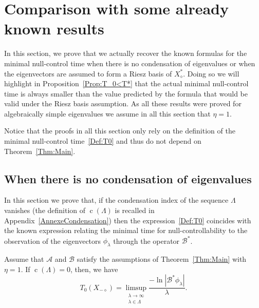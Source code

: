 \documentclass[10pt]{amsart}
\theoremstyle{definition}\newtheorem{defi}[theo]{Definition}\newtheorem{rema}[theo]{Remark}\newtheorem{exam}[theo]{Example}\newtheorem{exem}[theo]{Example}\newtheorem{nota}[theo]{Notation}
\newcommand\A{\mathcal{A}}
\newcommand\B{\mathcal{B}}
\newcommand\Bs{\mathcal{B}^*}
\newcommand{\Xalphas}{X_\diamond^*}
\newcommand{\Xmalpha}{X_{-\diamond}}
\DeclareMathOperator{\cond}{c}
\begin{document}
\section{Comparison with some already known results} \label{Sec:AutresExpressions}

In this section, we prove that we actually recover the known formulas for the minimal null-control time when there is no condensation of eigenvalues or when the eigenvectors are assumed to form a Riesz basis of $\Xalphas$. Doing so we will highlight in Proposition~\ref{Prop:T_0<T*} that the actual minimal null-control time is always smaller than the value predicted by the formula that would be valid under the Riesz basis assumption. As all these results were proved for algebraically simple eigenvalues we assume in all this section that $\eta=1$.

Notice that the proofs in all this section only rely on the definition of the minimal null-control time~\eqref{Def:T0} and thus do not depend on Theorem~\ref{Thm:Main}.


\subsection{When there is no condensation of eigenvalues} \label{Subsec:NoCondensation}

In this section we prove that, if the condensation index of the sequence $\Lambda$ vanishes (the definition of $\cond(\Lambda)$ is recalled in Appendix~\ref{AnnexeCondensation}) then the expression~\eqref{Def:T0} coincides with the known expression relating the minimal time for null-controllability to the observation of the eigenvectors $\phi_\lambda$ through the operator $\Bs$.

\begin{prop}
Assume that $\A$ and $\B$ satisfy the assumptions of Theorem~\ref{Thm:Main} with $\eta=1$. If $\cond(\Lambda) =0$, then, we have
\[
T_{0}(\Xmalpha)=\limsup_{\substack{\lambda\to \infty\\ \lambda\in \Lambda}} \frac{-\ln \left| \Bs \phi_\lambda \right|}{\lambda}.
\]
\end{prop}
\end{document}
